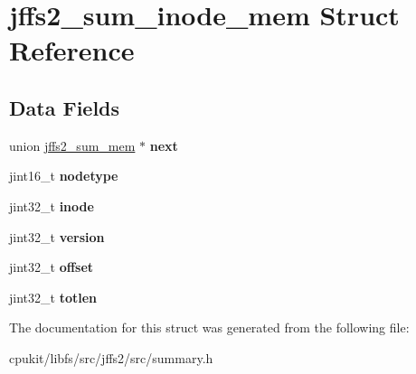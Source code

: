 \hypertarget{structjffs2__sum__inode__mem}{}\section{jffs2\+\_\+sum\+\_\+inode\+\_\+mem Struct Reference}
\label{structjffs2__sum__inode__mem}
\subsection*{Data Fields}
\begin{DoxyCompactItemize}
\item 
\mbox{\label{structjffs2__sum__inode__mem_a97bc1e5bc763aef485844ea589511c55}} 
union \mbox{\hyperlink{unionjffs2__sum__mem}{jffs2\+\_\+sum\+\_\+mem}} $\ast$ {\bfseries next}
\item 
\mbox{\label{structjffs2__sum__inode__mem_ab1c05e29e2476a5128d91d9321960015}} 
jint16\+\_\+t {\bfseries nodetype}
\item 
\mbox{\label{structjffs2__sum__inode__mem_ade6db8f39dfa8b9742ba829acf2c2ae8}} 
jint32\+\_\+t {\bfseries inode}
\item 
\mbox{\label{structjffs2__sum__inode__mem_ace8d6874a8e76372acd6a3aeb8423dfa}} 
jint32\+\_\+t {\bfseries version}
\item 
\mbox{\label{structjffs2__sum__inode__mem_ad2c2f3a0327aeb6688b14697753ef637}} 
jint32\+\_\+t {\bfseries offset}
\item 
\mbox{\label{structjffs2__sum__inode__mem_a028d159a8a8c66dbb5ff1243cf2c66ef}} 
jint32\+\_\+t {\bfseries totlen}
\end{DoxyCompactItemize}


The documentation for this struct was generated from the following file\+:\begin{DoxyCompactItemize}
\item 
cpukit/libfs/src/jffs2/src/summary.\+h\end{DoxyCompactItemize}
